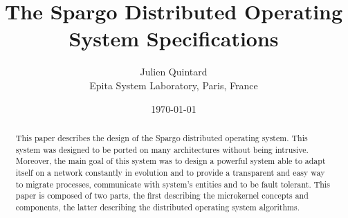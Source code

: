 \documentclass[10pt,a4wide]{article}
\title{The Spargo Distributed Operating System Specifications}
\author{\small{Julien Quintard} \\
        \scriptsize{Epita System Laboratory, Paris, France}}
\date{\scriptsize{\today}}
\begin{document}
\maketitle

\begin{abstract}

This paper describes the design of the Spargo distributed operating system.
This system was designed to be ported on many architectures without being
intrusive. Moreover, the main goal of this system was to design a powerful
system able to adapt itself on a network constantly in evolution and to
provide a transparent and easy way to migrate processes, communicate
with system's entities and to be fault tolerant. This paper is composed of
two parts, the first describing the microkernel concepts and components,
the latter describing the distributed operating system algorithms.

\end{abstract}

\paragraph{}
\paragraph{}
\end{document}
